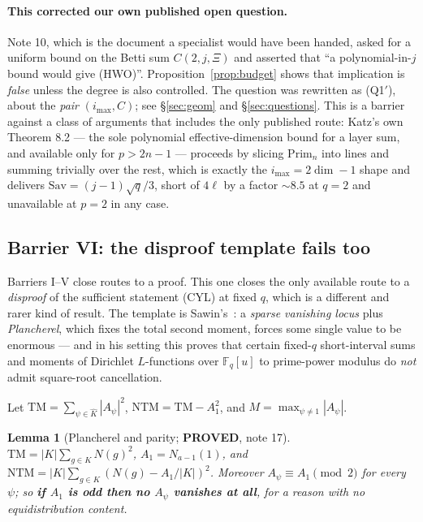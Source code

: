 \documentclass[10pt]{article}
\theoremstyle{plain}
\newtheorem{lemma}[theorem]{Lemma}
\theoremstyle{definition}
\newcommand{\F}{\mathbb F}
\newcommand{\Prim}{\mathrm{Prim}}
\newcommand{\imax}{i_{\max}}
\newcommand{\proved}{\textcolor{proved}{\textsf{\textbf{\footnotesize PROVED}}}}
\begin{document}
\paragraph{This corrected our own published open question.} Note 10, which is
the document a specialist would have been handed, asked for a uniform bound on
the Betti sum $C(2,j,\Xi)$ and asserted that ``a polynomial-in-$j$ bound would
give (HWO)''. Proposition~\ref{prop:budget} shows that implication is
\emph{false} unless the degree is also controlled. The question was rewritten
as (Q1$'$), about the \emph{pair} $(\imax,C)$; see \S\ref{sec:geom} and
\S\ref{sec:questions}. This is a barrier against a class of arguments that
includes the only published route: Katz's own Theorem 8.2 --- the sole
polynomial effective-dimension bound for a layer sum, and available only for
$p>2n-1$ --- proceeds by slicing $\Prim_n$ into lines and summing trivially over
the rest, which is exactly the $\imax=2\dim-1$ shape and delivers
$\mathrm{Sav}=(j-1)\sqrt q/3$, short of $4\ell$ by a factor $\sim8.5$ at $q=2$
and unavailable at $p=2$ in any case.

\subsection{Barrier VI: the disproof template fails too}\label{sec:bar6}

Barriers I--V close routes to a proof. This one closes the only available route
to a \emph{disproof} of the sufficient statement (CYL) at fixed $q$, which is a
different and rarer kind of result. The template is Sawin's~\cite{SawinKl}:
a \emph{sparse vanishing locus} plus \emph{Plancherel}, which fixes the total
second moment, forces some single value to be enormous --- and in his setting
this proves that certain fixed-$q$ short-interval sums and moments of Dirichlet
$L$-functions over $\F_q[u]$ to prime-power modulus do \emph{not} admit
square-root cancellation.

Let $\mathrm{TM}=\sum_{\psi\in\widehat K}|A_\psi|^2$,
$\mathrm{NTM}=\mathrm{TM}-A_1^2$, and $M=\max_{\psi\ne1}|A_\psi|$.

\begin{lemma}[Plancherel and parity; \proved, note 17]
$\mathrm{TM}=|K|\sum_{g\in K}N(g)^2$, $A_1=N_{a-1}(1)$, and
$\mathrm{NTM}=|K|\sum_{g\in K}(N(g)-A_1/|K|)^2$. Moreover
$A_\psi\equiv A_1\pmod 2$ for every $\psi$; so \textbf{if $A_1$ is odd then no
$A_\psi$ vanishes at all}, for a reason with no equidistribution content.
\end{lemma}
\end{document}
